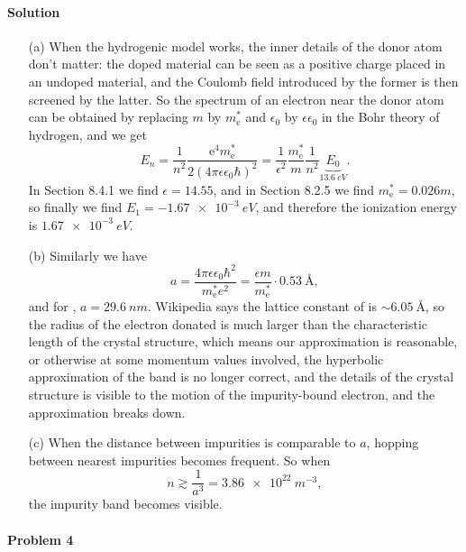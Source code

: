 \documentclass[hyperref, a4paper]{article}
\begin{document}
\paragraph{Solution} \begin{itemize}
\item[(a)] When the hydrogenic model works,
the inner details of the donor atom don't matter: 
the doped material can be seen as a positive charge 
placed in an undoped material,
and the Coulomb field introduced by the former is then screened by the latter.
So the spectrum of an electron near the donor atom can be obtained 
by replacing $m$ by $m^*_{\text{e}}$ and $\epsilon_0$ by $\epsilon \epsilon_0$
in the Bohr theory of hydrogen, 
and we get 
\begin{equation}
    E_n = \frac{1}{n^2} \frac{\mathrm{e}^4 m^*_{\mathrm{e}}}{2\left(4 \pi \epsilon \epsilon_0 \hbar\right)^2}
    = \frac{1}{\epsilon^2} \frac{m^*_{\text{e}}}{m} \frac{1}{n^2} \underbrace{E_0}_{\SI{13.6}{eV}}.
\end{equation}
In Section 8.4.1 we find $\epsilon = 14.55$, and in Section 8.2.5 we find $m_{\text{e}}^* = 0.026 m$,
so finally we find $E_1 = - \SI{1.67e-3}{eV}$,
and therefore the ionization energy is $\SI{1.67e-3}{eV}$.

\item[(b)] Similarly we have 
\begin{equation}
    a = \frac{4 \pi \epsilon \epsilon_0 \hbar^2}{m_{\text{e}}^* e^2} = \frac{\epsilon m}{m_{\text{e}}^*} \cdot \SI{0.53}{\angstrom},
\end{equation}
and for , $a = \SI{29.6}{nm}$.
Wikipedia says the lattice constant of  is $\sim \SI{6.05}{\angstrom}$,
so the radius of the electron donated is much larger than the characteristic length of the crystal structure,
which means our approximation is reasonable,
or otherwise at some momentum values involved,
the hyperbolic approximation of the band is no longer correct,
and the details of the crystal structure is visible 
to the motion of the impurity-bound electron,
and the approximation breaks down.

\item[(c)] When the distance between impurities is comparable to $a$,
hopping between nearest impurities becomes frequent.
So when 
\[
    n \gtrsim \frac{1}{a^3} = \SI{3.86e22}{m^{-3}},
\]
the impurity band becomes visible.

\end{itemize}

\paragraph{Problem 4} 
\end{document}

